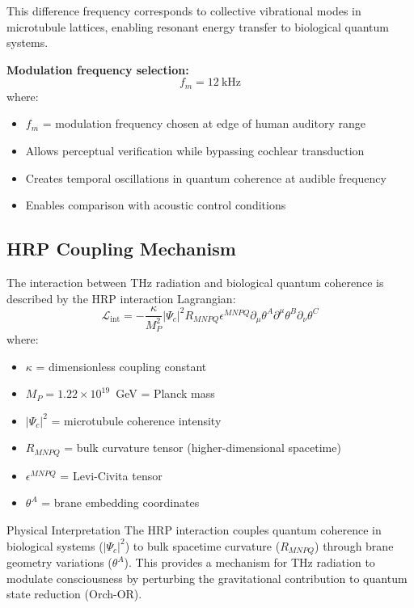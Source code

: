 This difference frequency corresponds to collective vibrational modes in microtubule lattices, enabling resonant energy transfer to biological quantum systems.

\textbf{Modulation frequency selection:}
\begin{equation}
f_m = 12~\text{kHz}
\end{equation}
where:
\begin{itemize}
\item $f_m$ = modulation frequency chosen at edge of human auditory range
\item Allows perceptual verification while bypassing cochlear transduction
\item Creates temporal oscillations in quantum coherence at audible frequency
\item Enables comparison with acoustic control conditions
\end{itemize}

\subsection{HRP Coupling Mechanism}

The interaction between THz radiation and biological quantum coherence is described by the HRP interaction Lagrangian:
\begin{equation}
\mathcal{L}_{\text{int}} = -\frac{\kappa}{M_P^2} |\Psi_c|^2 R_{MNPQ} \epsilon^{MNPQ} \partial_\mu \theta^A \partial^\mu \theta^B \partial_\nu \theta^C
\end{equation}
where:
\begin{itemize}
\item $\kappa$ = dimensionless coupling constant
\item $M_P = 1.22 \times 10^{19}$~GeV = Planck mass
\item $|\Psi_c|^2$ = microtubule coherence intensity
\item $R_{MNPQ}$ = bulk curvature tensor (higher-dimensional spacetime)
\item $\epsilon^{MNPQ}$ = Levi-Civita tensor
\item $\theta^A$ = brane embedding coordinates
\end{itemize}

\begin{calloutbox}{Physical Interpretation}
The HRP interaction couples quantum coherence in biological systems ($|\Psi_c|^2$) to bulk spacetime curvature ($R_{MNPQ}$) through brane geometry variations ($\theta^A$). This provides a mechanism for THz radiation to modulate consciousness by perturbing the gravitational contribution to quantum state reduction (Orch-OR).
\end{calloutbox}

